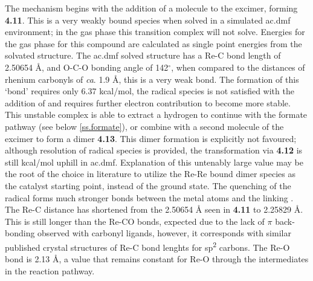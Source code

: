 The mechanism begins with the addition of a  molecule to the excimer, forming \textbf{4.11}. This is a very weakly bound species when solved in a simulated \gls{ac.dmf} environment; in the gas phase this transition complex will not solve. Energies for the gas phase for this compound are calculated as single point energies from the solvated structure. The \gls{ac.dmf} solved structure has a Re-C bond length of 2.50654 \r{A}, and O-C-O bonding angle of 142$^\circ$, when compared to the  distances of rhenium carbonyls of \textit{ca}. 1.9 \r{A}, this is a very weak bond. The formation of this `bond' requires only 6.37 kcal/mol, the radical species is not satisfied with the addition of  and requires further electron contribution to become more stable. This unstable complex is able to extract a hydrogen to continue with the formate pathway (see below \autoref{ss.formate}), or combine with a second molecule of the excimer to form a dimer \textbf{4.13}. This dimer formation is explicitly not favoured; although resolution of radical species is provided, the transformation via \textbf{4.12} is still  kcal/mol uphill in \gls{ac.dmf}. Explanation of this untenably large value may be the root of the choice in literature to utilize the Re-Re bound dimer species as the catalyst starting point, instead of the ground state.  The quenching of the radical forms much stronger bonds between the metal atoms and the linking . The Re-C distance has shortened from the 2.50654 \r{A} seen in \textbf{4.11} to 2.25829 \r{A}. This is still longer than the Re-CO bonds, expected due to the lack of $\pi$ back-bonding observed with carbonyl ligands, however, it corresponds with similar published crystal structures of Re-C bond lenghts for sp\textsuperscript{2} carbons\autocite{lukehart1977}. The Re-O bond is 2.13 \r{A}, a value that remains constant for Re-O through the intermediates in the reaction pathway.

